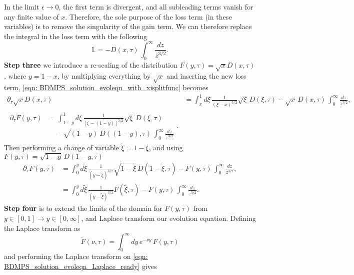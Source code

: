 \documentclass[main.tex]{subfiles}
\begin{document}
In the limit \(\epsilon \rightarrow 0\), the first term is divergent, and all subleading terms vanish for any finite value of \(x\). Therefore, the sole purpose of the loss term (in these variables) is to remove the singularity of the gain term.  We can therefore replace the integral in the loss term with the following 
\begin{equation}
    \mathbb{L} = - D(x,\tau) \, \int_0^\infty \frac{dz}{z^{3/2}}.
\end{equation}
\textbf{Step three} we introduce a re-scaling of the distribution \(F(y, \tau ) = \sqrt{x} D(x,\tau)\) , where \(y = 1-x\), by multiplying everything by \(\sqrt{x}\) and inserting the new loss term, \autoref{eqn: BDMPS_solution_evoleqn_with_xisplitfunc} becomes
\begin{align}
    \partial_\tau \sqrt{x} D(x,\tau) &= \int_x^1 d\xi \, \frac{1}{(\xi-x)^{3/2}} \sqrt{\xi} \,D(\xi, \tau) - \sqrt{x}\, D(x,\tau) \, \int_0^\infty \frac{dz}{z^{3/2}}, \nonumber \\
    \begin{split}
        \partial_\tau F(y,\tau) &= \int_{1-y}^1 d\xi \, \frac{1}{[\xi-(1-y)]^{3/2}} \sqrt{\xi} \,D(\xi, \tau) \\
        &\quad - \sqrt{(1-y)}\, D((1-y),\tau) \, \int_0^\infty \frac{dz}{z^{3/2}}
    \end{split}.
\end{align}
Then performing a change of variable \(\tilde{\xi} = 1- \xi\), and using \(F(y, \tau ) = \sqrt{1-y} \,D(1-y,\tau)\)
\begin{align}\label{eqn: BDMPS_solution_evoleqn_Laplace_ready}
    \partial_\tau F(y,\tau) &= \int_0^{y} d\tilde{\xi} \, \frac{1}{(y-\tilde{\xi})^{3/2}} \sqrt{1-\tilde{\xi}} \,D(1-\tilde{\xi}, \tau) - F(y,\tau) \, \int_0^\infty \frac{dz}{z^{3/2}}, \nonumber \\
    &= \int_0^{y} d\tilde{\xi} \, \frac{1}{(y-\tilde{\xi})^{3/2}} F(\tilde{\xi}, \tau) - F(y,\tau) \, \int_0^\infty \frac{dz}{z^{3/2}}.
\end{align}
\textbf{Step four} is to extend the limits of the domain for \(F(y,\tau)\) from \(y\in[0,1] \rightarrow y \in [0, \infty]\), and Laplace transform our evolution equation. Defining the Laplace transform as
\begin{equation}\label{eqn: BDMPS_solution_Laplace_definition}
    \tilde{F}(\nu, \tau) = \int_0^\infty dy \, e^{-\nu y}\, F(y,\tau) 
\end{equation}
and performing the Laplace transform on \autoref{eqn: BDMPS_solution_evoleqn_Laplace_ready} gives
\end{document}
